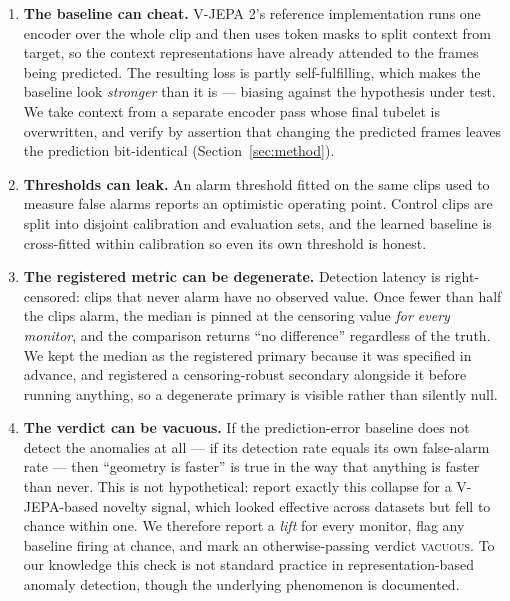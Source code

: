 \begin{enumerate}
\item \textbf{The baseline can cheat.} V-JEPA 2's reference implementation runs
one encoder over the whole clip and then uses token masks to split context from
target, so the context representations have already attended to the frames being
predicted. The resulting loss is partly self-fulfilling, which makes the
baseline look \emph{stronger} than it is --- biasing against the hypothesis
under test. We take context from a separate encoder pass whose final tubelet is
overwritten, and verify by assertion that changing the predicted frames leaves
the prediction bit-identical (Section~\ref{sec:method}).

\item \textbf{Thresholds can leak.} An alarm threshold fitted on the same clips
used to measure false alarms reports an optimistic operating point. Control
clips are split into disjoint calibration and evaluation sets, and the learned
baseline is cross-fitted within calibration so even its own threshold is honest.

\item \textbf{The registered metric can be degenerate.} Detection latency is
right-censored: clips that never alarm have no observed value. Once fewer than
half the clips alarm, the median is pinned at the censoring value \emph{for
every monitor}, and the comparison returns ``no difference'' regardless of the
truth. We kept the median as the registered primary because it was specified in
advance, and registered a censoring-robust secondary alongside it before running
anything, so a degenerate primary is visible rather than silently null.

\item \textbf{The verdict can be vacuous.} If the prediction-error baseline does
not detect the anomalies at all --- if its detection rate equals its own
false-alarm rate --- then ``geometry is faster'' is true in the way that
anything is faster than never. This is not hypothetical:
\citet{pavuluri2026asleep} report exactly this collapse for a V-JEPA-based
novelty signal, which looked effective across datasets but fell to chance within
one. We therefore report a \emph{lift} for every monitor, flag any baseline
firing at chance, and mark an otherwise-passing verdict \textsc{vacuous}. To our
knowledge this check is not standard practice in representation-based anomaly
detection, though the underlying phenomenon is documented.
\end{enumerate}

